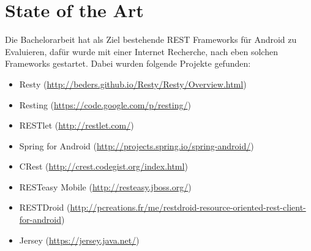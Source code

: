 \documentclass[a4paper,10pt,german,public]{INSOexpose}
\begin{document}
\section{State of the Art}
Die Bachelorarbeit hat als Ziel bestehende REST Frameworks für Android zu Evaluieren, dafür wurde  mit einer Internet Recherche, nach eben solchen Frameworks gestartet. Dabei wurden folgende Projekte gefunden:
\begin{itemize}
	\item Resty (\url{http://beders.github.io/Resty/Resty/Overview.html})
	\item Resting (\url{https://code.google.com/p/resting/})
	\item RESTlet (\url{http://restlet.com/})
	\item Spring for Android (\url{http://projects.spring.io/spring-android/})
	\item CRest (\url{http://crest.codegist.org/index.html})
	\item RESTeasy Mobile (\url{http://resteasy.jboss.org/})
	\item RESTDroid (\url{http://pcreations.fr/me/restdroid-resource-oriented-rest-client-for-android})
	\item Jersey (\url{https://jersey.java.net/})
\end{itemize}

\end{document}
